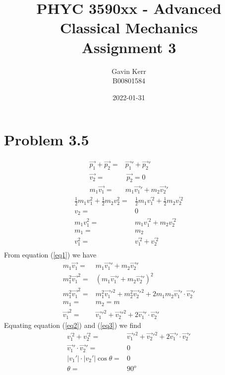 \documentclass[12pt, a4paper]{article}
\title{PHYC 3590xx - Advanced Classical Mechanics\\Assignment 3}
\author{Gavin Kerr\\B00801584}
\date{2022-01-31}
\begin{document}
\maketitle








\section*{Problem 3.5}
\begin{align}
\vec{p_1} + \vec{p_2} =& \vec{p_1}' + \vec{p_2}'
\\
\vec{v_2} =& \, \vec{p_2} = 0
\\
m_1\vec{v_1} =& m_1\vec{v_1}' + m_2\vec{v_2}' \label{eq1}
\end{align}
\begin{align}
\tfrac{1}{2}m_1v_1^2 + \tfrac{1}{2}m_2v_2^2 =& \tfrac{1}{2}m_1v_1^{'2} + \tfrac{1}{2}m_2v_2^{'2}
\\
v_2 =& 0
\\
m_1v_1^2 =& m_1v_1^{'2} + m_2v_2^{'2} 
\\
m_1 =& m_2
\\
v_1^2 =& v_1^{'2} + v_2^{'2} \label{eq2}
\\
\end{align}
From equation (\ref{eq1}) we have
\begin{align}
m_1\vec{v_1} =& m_1\vec{v_1}' + m_2\vec{v_2}' 
\\
m_1^2\vec{v_1}^2 =& (m_1\vec{v_1}' + m_2\vec{v_2}')^2 
\\
m_1^2\vec{v_1}^2 =& m_1^2 \vec{v_1}'^2  + m_2^2 \vec{v_2}'^2 + 2m_1m_2\vec{v_1}'\cdot\vec{v_2}'
\\
m_1 =& m_2 = m
\\
\vec{v_1}^2 =& \vec{v_1}'^2  + \vec{v_2}'^2 + 2\vec{v_1}'\cdot\vec{v_2}' \label{eq3}
\end{align}
Equating equation (\ref{eq2}) and (\ref{eq3}) we find
\begin{align*}
v_1^{'2} + v_2^{'2} =& \vec{v_1}'^2  + \vec{v_2}'^2 + 2\vec{v_1}'\cdot\vec{v_2}'
\\
\vec{v_1}'\cdot\vec{v_2}' =& 0
\\
|v_1'| \cdot |v_2'| \cos\theta =& 0
\\
\theta =& \boxed{90^o}
\end{align*}
\end{document}
